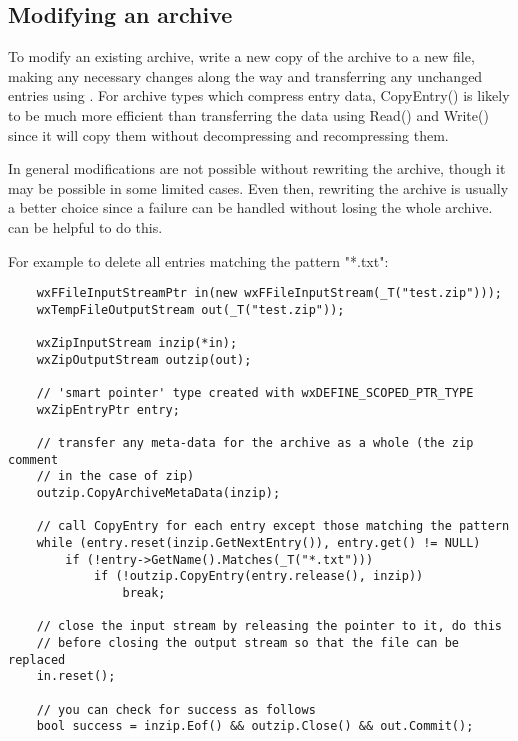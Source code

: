 \subsection{Modifying an archive}\label{wxarcmodify}


To modify an existing archive, write a new copy of the archive to a new file,
making any necessary changes along the way and transferring any unchanged
entries using .
For archive types which compress entry data, CopyEntry() is likely to be
much more efficient than transferring the data using Read() and Write()
since it will copy them without decompressing and recompressing them.

In general modifications are not possible without rewriting the archive,
though it may be possible in some limited cases. Even then, rewriting the
archive is usually a better choice since a failure can be handled without
losing the whole
archive.  can
be helpful to do this.

For example to delete all entries matching the pattern "*.txt":

\begin{verbatim}
    wxFFileInputStreamPtr in(new wxFFileInputStream(_T("test.zip")));
    wxTempFileOutputStream out(_T("test.zip"));

    wxZipInputStream inzip(*in);
    wxZipOutputStream outzip(out);

    // 'smart pointer' type created with wxDEFINE_SCOPED_PTR_TYPE
    wxZipEntryPtr entry;

    // transfer any meta-data for the archive as a whole (the zip comment
    // in the case of zip)
    outzip.CopyArchiveMetaData(inzip);

    // call CopyEntry for each entry except those matching the pattern
    while (entry.reset(inzip.GetNextEntry()), entry.get() != NULL)
        if (!entry->GetName().Matches(_T("*.txt")))
            if (!outzip.CopyEntry(entry.release(), inzip))
                break;

    // close the input stream by releasing the pointer to it, do this
    // before closing the output stream so that the file can be replaced
    in.reset();

    // you can check for success as follows
    bool success = inzip.Eof() && outzip.Close() && out.Commit();

\end{verbatim}

